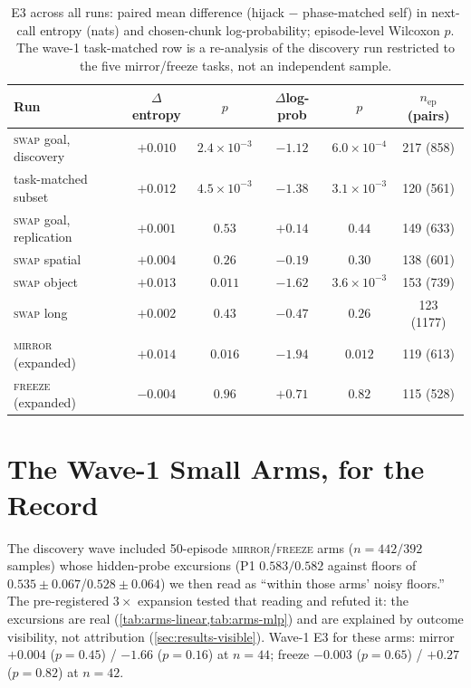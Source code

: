 \documentclass{article}
\begin{document}
\begin{table}[h]
\caption{E3 across all runs: paired mean difference (hijack $-$
phase-matched self) in next-call entropy (nats) and chosen-chunk
log-probability; episode-level Wilcoxon $p$. The wave-1 task-matched row is
a re-analysis of the discovery run restricted to the five mirror/freeze
tasks, not an independent sample.}
\label{tab:e3}
\vskip 0.1in
\centering
\small
\begin{tabular}{lccccc}
\toprule
Run & $\Delta$entropy & $p$ & $\Delta$log-prob & $p$ & $n_{\text{ep}}$ (pairs) \\
\midrule
\textsc{swap} goal, discovery & $+0.010$ & $2.4\times10^{-3}$ & $-1.12$ & $6.0\times10^{-4}$ & 217 (858) \\
\quad task-matched subset & $+0.012$ & $4.5\times10^{-3}$ & $-1.38$ & $3.1\times10^{-3}$ & 120 (561) \\
\textsc{swap} goal, replication & $+0.001$ & $0.53$ & $+0.14$ & $0.44$ & 149 (633) \\
\textsc{swap} spatial & $+0.004$ & $0.26$ & $-0.19$ & $0.30$ & 138 (601) \\
\textsc{swap} object & $+0.013$ & $0.011$ & $-1.62$ & $3.6\times10^{-3}$ & 153 (739) \\
\textsc{swap} long & $+0.002$ & $0.43$ & $-0.47$ & $0.26$ & 123 (1177) \\
\textsc{mirror} (expanded) & $+0.014$ & $0.016$ & $-1.94$ & $0.012$ & 119 (613) \\
\textsc{freeze} (expanded) & $-0.004$ & $0.96$ & $+0.71$ & $0.82$ & 115 (528) \\
\bottomrule
\end{tabular}
\end{table}

\section{The Wave-1 Small Arms, for the Record}
\label{app:wave1arms}

The discovery wave included 50-episode \textsc{mirror}/\textsc{freeze} arms
($n{=}442/392$ samples) whose hidden-probe excursions (P1 $0.583/0.582$
against floors of $0.535\pm0.067$/$0.528\pm0.064$) we then read as
``within those arms' noisy floors.'' The pre-registered $3\times$ expansion
tested that reading and refuted it: the excursions are real
(\cref{tab:arms-linear,tab:arms-mlp}) and are explained by outcome
visibility, not attribution (\cref{sec:results-visible}). Wave-1 E3 for
these arms: mirror $+0.004$ ($p{=}0.45$) / $-1.66$ ($p{=}0.16$) at
$n{=}44$; freeze $-0.003$ ($p{=}0.65$) / $+0.27$ ($p{=}0.82$) at $n{=}42$.
\end{document}
